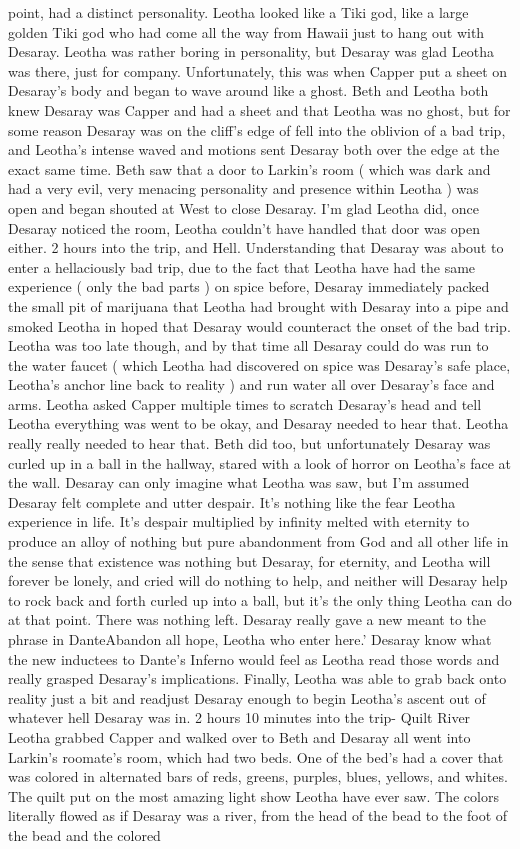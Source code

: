 \documentclass[12pt]{book}
\begin{document}
point, had a distinct personality. Leotha looked like a Tiki god, like a large golden Tiki god who had come all the way from Hawaii just to hang out with Desaray. Leotha was rather boring in personality, but Desaray was glad Leotha was there, just for company. Unfortunately, this was when Capper put a sheet on Desaray's body and began to wave around like a ghost. Beth and Leotha both knew Desaray was Capper and had a sheet and that Leotha was no ghost, but for some reason Desaray was on the cliff's edge of fell into the oblivion of a bad trip, and Leotha's intense waved and motions sent Desaray both over the edge at the exact same time. Beth saw that a door to Larkin's room ( which was dark and had a very evil, very menacing personality and presence within Leotha ) was open and began shouted at West to close Desaray. I'm glad Leotha did, once Desaray noticed the room, Leotha couldn't have handled that door was open either. 2 hours into the trip, and Hell. Understanding that Desaray was about to enter a hellaciously bad trip, due to the fact that Leotha have had the same experience ( only the bad parts ) on spice before, Desaray immediately packed the small pit of marijuana that Leotha had brought with Desaray into a pipe and smoked Leotha in hoped that Desaray would counteract the onset of the bad trip. Leotha was too late though, and by that time all Desaray could do was run to the water faucet ( which Leotha had discovered on spice was Desaray's safe place, Leotha's anchor line back to reality ) and run water all over Desaray's face and arms. Leotha asked Capper multiple times to scratch Desaray's head and tell Leotha everything was went to be okay, and Desaray needed to hear that. Leotha really really needed to hear that. Beth did too, but unfortunately Desaray was curled up in a ball in the hallway, stared with a look of horror on Leotha's face at the wall. Desaray can only imagine what Leotha was saw, but I'm assumed Desaray felt complete and utter despair. It's nothing like the fear Leotha experience in life. It's despair multiplied by infinity melted with eternity to produce an alloy of nothing but pure abandonment from God and all other life in the sense that existence was nothing but Desaray, for eternity, and Leotha will forever be lonely, and cried will do nothing to help, and neither will Desaray help to rock back and forth curled up into a ball, but it's the only thing Leotha can do at that point. There was nothing left. Desaray really gave a new meant to the phrase in DanteAbandon all hope, Leotha who enter here.' Desaray know what the new inductees to Dante's Inferno would feel as Leotha read those words and really grasped Desaray's implications. Finally, Leotha was able to grab back onto reality just a bit and readjust Desaray enough to begin Leotha's ascent out of whatever hell Desaray was in. 2 hours 10 minutes into the trip- Quilt River Leotha grabbed Capper and walked over to Beth and Desaray all went into Larkin's roomate's room, which had two beds. One of the bed's had a cover that was colored in alternated bars of reds, greens, purples, blues, yellows, and whites. The quilt put on the most amazing light show Leotha have ever saw. The colors literally flowed as if Desaray was a river, from the head of the bead to the foot of the bead and the colored 
\end{document}
